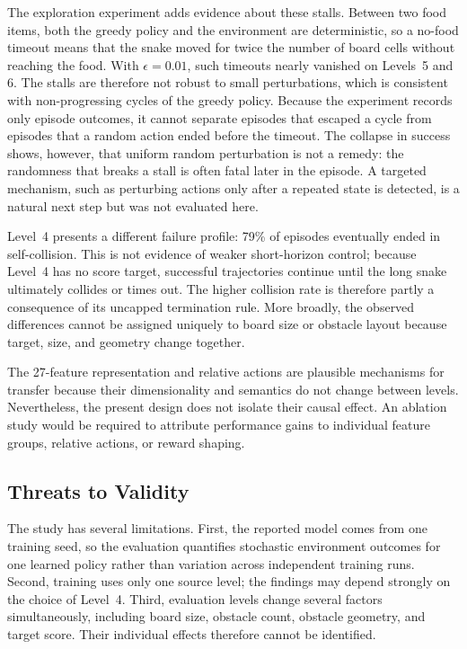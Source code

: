 \documentclass[journal]{IEEEtran}
\begin{document}
The exploration experiment adds evidence about these stalls. Between two food
items, both the greedy policy and the environment are deterministic, so a
no-food timeout means that the snake moved for twice the number of board cells
without reaching the food. With $\epsilon=0.01$, such timeouts nearly vanished on Levels~5 and
6. The stalls are therefore not robust to small perturbations, which is
consistent with non-progressing cycles of the greedy policy. Because the
experiment records only episode outcomes, it cannot separate episodes that
escaped a cycle from episodes that a random action ended before the timeout.
The collapse in success shows, however, that uniform random perturbation is not
a remedy: the randomness that breaks a stall is often fatal later in the
episode. A targeted mechanism, such as perturbing actions only after a repeated
state is detected, is a natural next step but was not evaluated here.

Level~4 presents a different failure profile: 79\% of episodes eventually
ended in self-collision. This is not evidence of weaker short-horizon control;
because Level~4 has no score target, successful trajectories continue until the
long snake ultimately collides or times out. The higher collision rate is
therefore partly a consequence of its uncapped termination rule. More broadly,
the observed differences cannot be assigned uniquely to board size or obstacle
layout because target, size, and geometry change together.

The 27-feature representation and relative actions are plausible mechanisms for
transfer because their dimensionality and semantics do not change between
levels. Nevertheless, the present design does not isolate their causal effect.
An ablation study would be required to attribute performance gains to individual
feature groups, relative actions, or reward shaping.

\subsection{Threats to Validity}

The study has several limitations. First, the reported model comes from one
training seed, so the evaluation quantifies stochastic environment outcomes for
one learned policy rather than variation across independent training runs.
Second, training uses only one source level; the findings may depend strongly on
the choice of Level~4. Third, evaluation levels change several factors
simultaneously, including board size, obstacle count, obstacle geometry, and
target score. Their individual effects therefore cannot be identified.
\end{document}

